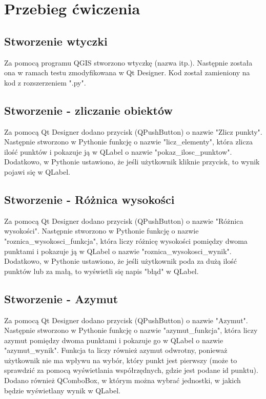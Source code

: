 \section{Przebieg ćwiczenia}

\subsection{Stworzenie wtyczki}
Za pomocą programu QGIS stworzono wtyczkę (nazwa itp.). Następnie została ona w ramach testu zmodyfikowana w Qt Designer. Kod został
zamieniony na kod z rozszerzeniem ".py".

\subsection{Stworzenie - zliczanie obiektów}
Za pomocą Qt Designer dodano przycisk (QPushButton) o nazwie "Zlicz punkty". Następnie stworzono w Pythonie funkcję o nazwie "licz\_elementy", która zlicza ilość punktów i pokazuje ją w QLabel o nazwie "pokaz\_ilosc\_punktow". Dodatkowo, w Pythonie ustawiono, że jeśli użytkownik kliknie przycisk, to wynik pojawi się w QLabel.

\subsection{Stworzenie - Różnica wysokości}
Za pomocą Qt Designer dodano przycisk (QPushButton) o nazwie "Różnica wysokości". Następnie stworzono w Pythonie funkcję o nazwie "roznica\_wysokosci\_funkcja", która liczy różnicę wysokości pomiędzy dwoma punktami i pokazuje ją w QLabel o nazwie "roznica\_wysokosci\_wynik". Dodatkowo, w Pythonie ustawiono, że jeśli użytkownik poda za dużą ilość punktów lub za małą, to wyświetli się napis "błąd" w QLabel.

\subsection{Stworzenie - Azymut}
Za pomocą Qt Designer dodano przycisk (QPushButton) o nazwie "Azymut". Następnie stworzono w Pythonie funkcję o nazwie "azymut\_funkcja", która liczy azymut pomiędzy dwoma punktami i pokazuje go w QLabel o nazwie "azymut\_wynik". Funkcja ta liczy również azymut odwrotny, ponieważ użytkownik nie ma wpływu na wybór, który punkt jest pierwszy (może to sprawdzić za pomocą wyświetlania współrzędnych, gdzie jest podane id punktu). Dodano również QComboBox, w którym można wybrać jednostki, w jakich będzie wyświetlany wynik w QLabel.

